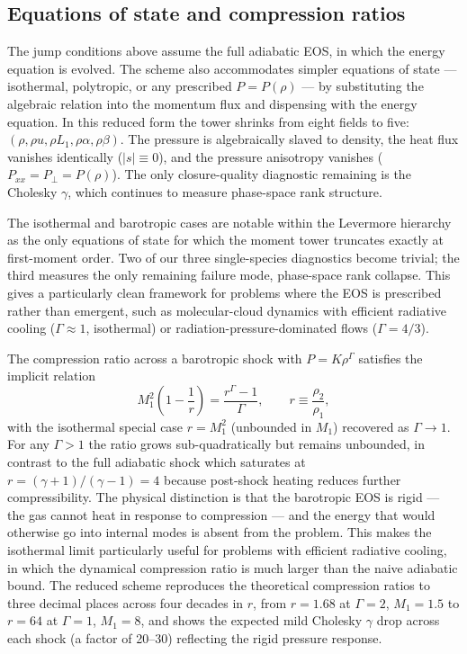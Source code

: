 \documentclass[11pt,letterpaper]{article}
\begin{document}
\subsection{Equations of state and compression ratios}

The jump conditions above assume the full adiabatic EOS, in which the energy equation is evolved. The scheme also accommodates simpler equations of state --- isothermal, polytropic, or any prescribed $P = P(\rho)$ --- by substituting the algebraic relation into the momentum flux and dispensing with the energy equation. In this reduced form the tower shrinks from eight fields to five: $(\rho, \rho u, \rho L_1, \rho \alpha, \rho \beta)$. The pressure is algebraically slaved to density, the heat flux vanishes identically ($|s| \equiv 0$), and the pressure anisotropy vanishes ($P_{xx} = P_\perp = P(\rho)$). The only closure-quality diagnostic remaining is the Cholesky $\gamma$, which continues to measure phase-space rank structure.

The isothermal and barotropic cases are notable within the Levermore hierarchy as the only equations of state for which the moment tower truncates exactly at first-moment order. Two of our three single-species diagnostics become trivial; the third measures the only remaining failure mode, phase-space rank collapse. This gives a particularly clean framework for problems where the EOS is prescribed rather than emergent, such as molecular-cloud dynamics with efficient radiative cooling ($\Gamma \approx 1$, isothermal) or radiation-pressure-dominated flows ($\Gamma = 4/3$).

The compression ratio across a barotropic shock with $P = K \rho^\Gamma$ satisfies the implicit relation
\begin{equation}
M_1^2 \left(1 - \frac{1}{r}\right) = \frac{r^\Gamma - 1}{\Gamma}, \qquad r \equiv \frac{\rho_2}{\rho_1},
\label{eq:baro_jump}
\end{equation}
with the isothermal special case $r = M_1^2$ (unbounded in $M_1$) recovered as $\Gamma \to 1$. For any $\Gamma > 1$ the ratio grows sub-quadratically but remains unbounded, in contrast to the full adiabatic shock which saturates at $r = (\gamma+1)/(\gamma-1) = 4$ because post-shock heating reduces further compressibility. The physical distinction is that the barotropic EOS is rigid --- the gas cannot heat in response to compression --- and the energy that would otherwise go into internal modes is absent from the problem. This makes the isothermal limit particularly useful for problems with efficient radiative cooling, in which the dynamical compression ratio is much larger than the naive adiabatic bound. The reduced scheme reproduces the theoretical compression ratios to three decimal places across four decades in $r$, from $r = 1.68$ at $\Gamma = 2$, $M_1 = 1.5$ to $r = 64$ at $\Gamma = 1$, $M_1 = 8$, and shows the expected mild Cholesky $\gamma$ drop across each shock (a factor of 20--30) reflecting the rigid pressure response.
\end{document}
